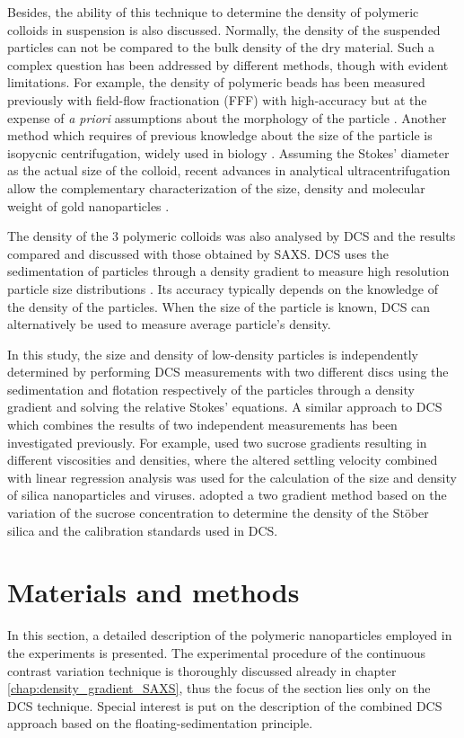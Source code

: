 Besides, the ability of this technique to determine the density of polymeric colloids in suspension is also discussed. Normally, the density of the suspended particles can not be compared to the bulk density of the dry material. Such a complex question has been addressed by different methods, though with evident limitations. For example, the density of polymeric beads has been measured previously with field-flow fractionation (FFF) with high-accuracy but at the expense of \emph{a priori} assumptions about the morphology of the particle \citep{giddings_density_1981,yang_colloid_1983,caldwell_measurement_1986}. Another method which requires of previous knowledge about the size of the particle is isopycnic centrifugation, widely used in biology \citep{vauthier_measurement_1999}. Assuming the Stokes' diameter as the actual size of the colloid, recent advances in analytical ultracentrifugation allow the complementary characterization of the size, density and molecular weight of gold nanoparticles \citep{carney_determination_2011}.

The density of the 3 polymeric colloids was also analysed by DCS and the results compared and discussed with those obtained by SAXS. DCS uses the sedimentation of particles through a density gradient to measure high resolution particle size distributions \citep{minelli_characterization_2014}. Its accuracy typically depends on the knowledge of the density of the particles. When the size of the particle is known, DCS can alternatively be used to measure average particle's density.

In this study, the size and density of low-density particles is independently determined by performing DCS measurements with two different discs using the sedimentation and flotation respectively of the particles through a density gradient and solving the relative Stokes' equations. A similar approach to DCS which combines the results of two independent measurements has been investigated previously. For example, \cite{neumann_new_2013} used two sucrose gradients resulting in different viscosities and densities, where the altered settling velocity combined with linear regression analysis was used for the calculation of the size and density of silica nanoparticles and viruses. \cite{bell_emerging_2012} adopted a two gradient method based on the variation of the sucrose concentration to determine the density of the St\"ober silica and the calibration standards used in DCS.

\section{Materials and methods}
In this section, a detailed description of the polymeric nanoparticles employed in the experiments is presented. The experimental procedure of the continuous contrast variation technique is thoroughly discussed already in chapter \ref{chap:density_gradient_SAXS}, thus the focus of the section lies only on the DCS technique. Special interest is put on the description of the combined DCS approach based on the floating-sedimentation principle.


